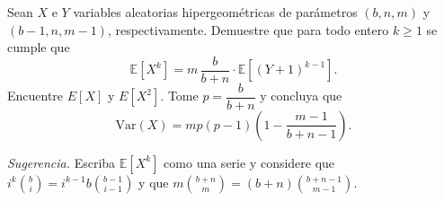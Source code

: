 \documentclass[12pt,a4paper]{article}
\begin{document}
    \begin{mdframed}[style=mdpinkbox, frametitle={Ejercicio 6}]
        Sean $X$ e $Y$ variables aleatorias hipergeométricas de parámetros $(b, n, m)$ y
        $(b-1, n, m-1)$, respectivamente. Demuestre que para todo entero $k \geq 1$ se cumple que
        \begin{equation*}
            \mathbb{E}[X^k] = m\,\frac{b}{b+n} \cdot \mathbb{E}[(Y+1)^{k-1}].
        \end{equation*}
        Encuentre $E[X]$ y $E[X^2]$. Tome $p = \dfrac{b}{b+n}$ y concluya que
        \begin{equation*}
            \mathrm{Var}(X) = mp(p-1)\!\left(1 - \frac{m-1}{b+n-1}\right).
        \end{equation*}

        \medskip
        \noindent\textit{Sugerencia.} Escriba $\mathbb{E}[X^k]$ como una serie y considere que
        $i^k \binom{b}{i} = i^{k-1} b \binom{b-1}{i-1}$ y que $m\binom{b+n}{m} = (b+n)\binom{b+n-1}{m-1}$.
    \end{mdframed}
\end{document}
